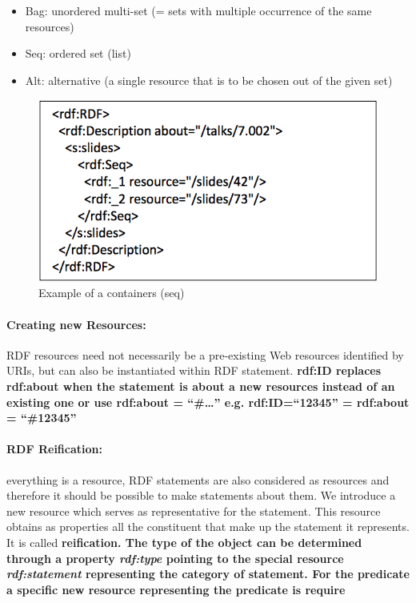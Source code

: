 \begin{itemize}
\item Bag: unordered multi-set (= sets with multiple occurrence of the same resources)
\item Seq: ordered set (list)
\item Alt: alternative (a single resource that is to be chosen out of the given set)
\end{itemize}

\begin{figure}[H]
\begin{center}
\includegraphics[width=1\linewidth]{figures/container.png}
\end{center}
\caption{Example of a containers (seq)}
\end{figure}

\paragraph{Creating new Resources:} RDF resources need not necessarily be a pre-existing Web
resources identified by URIs, but can also be instantiated within RDF statement. \bf{rdf:ID}
replaces \bf{rdf:about} when the statement is about a new resources instead of an existing one or
use rdf:about = ``\#\dots'' e.g. rdf:ID=``12345'' = rdf:about = ``\#12345''

\paragraph{RDF Reification:} everything is a resource, RDF statements are also considered as resources and therefore it should be possible to make statements about them. We introduce a new resource which serves as representative for the statement. This resource obtains as properties all the constituent that make up the statement it represents. It is called \bf{reification}. The type of the object can be determined through a property \textit{rdf:type} pointing to the special resource \textit{rdf:statement} representing the category of statement. For the predicate a specific new resource representing the predicate is require

